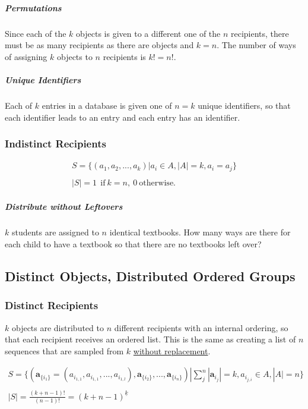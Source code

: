 \subparagraph{Permutations} Since each of the $k$ objects is given to a different one of the $n$ recipients, there must be as many recipients as there are objects and $k=n$. The number of ways of assigning $k$ objects to $n$ recipients is $k!=n!$.

\subparagraph{Unique Identifiers} Each of $k$ entries in a database is given one of $n=k$ unique identifiers, so that each identifier leads to an entry and each entry has an identifier. 

\subsubsection{Indistinct Recipients}

\begin{equation}	
\begin{array}{l}
S = \{ (a_1,a_2,...,a_k) | a_i \in A, |A| = k, a_i=a_j\}\\
\\
|S| = 1\ \ \mathrm{if\ }k = n,\ 0\ \mathrm{otherwise.}
\end{array}
\end{equation}



\subparagraph{Distribute without Leftovers} $k$ students are assigned to $n$ identical textbooks. How many ways are there for each child to have a textbook so that there are no textbooks left over? 
 


\subsection{Distinct Objects, Distributed Ordered Groups}

\subsubsection{Distinct Recipients}
$k$ objects are distributed to $n$ different recipients with an internal ordering, so that each recipient receives an ordered list. This is the same as creating a list of $n$ sequences that are sampled from $k$ \underline{without replacement}. 

\begin{equation}
\begin{array}{l}
S = \{ (\mathbf{a}_{\{i_1\}}  = ( a_{i_{1,1}},a_{i_{1,1}},...,a_{i_{1,l}} ),\mathbf{a}_{\{i_2\}},...,\mathbf{a}_{\{i_n\}}) | \sum^n_j |\mathbf{a}_{i_j}| = k, a_{i_{j,i}} \in A, |A| = n \} \\
\\
|S| = \frac{(k + n - 1)!}{(n-1)!} = ( k+n-1)^{\underline{k}}
\end{array}
\end{equation}


